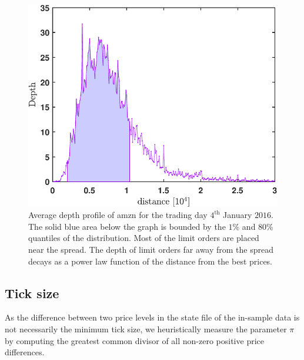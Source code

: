 \documentclass[11pt, a4paper]{thesis}  %
\begin{document}
\begin{figure}[htp]	
	\centering
    \includegraphics[width=\textwidth]{./AverageDepthProfile/AMZN/average_depth_profile.pdf}
	\caption{Average depth profile of \ac{amzn} for the trading day $4^\textrm{th}$ January $2016$. 
	The solid blue area below the graph is bounded by the $1$\% and $80$\% quantiles of 
	the distribution. Most of the limit orders are placed near the spread. The depth of limit orders far away from the spread decays as a power law function of the distance from the best prices.}
	\label{figure:methods:simulation_windows}
\end{figure}


\subsection{Tick size} 

As the difference between two price levels in the state file of the in-sample data is not necessarily the minimum tick size, we heuristically measure the parameter $\pi$ by computing the greatest common divisor of all non-zero positive price differences.

\end{document}
